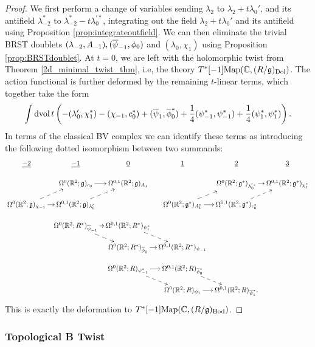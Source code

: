 \documentclass[10pt, oneside]{article}
\begin{document}
\begin{proof}
We first perform a change of variables sending $\lambda_2$ to $\lambda_2 + t\lambda_0'$, and its antifield $\lambda_{-2}^*$ to $\lambda_{-2}^* - t\lambda_0^{'*}$, integrating out the field $\lambda_2 + t\lambda_0'$ and its antifield using Proposition \ref{prop:integrateoutfield}.  We can then eliminate the trivial BRST doublets $(\lambda_{-2}, A_{-1}), (\overline{\psi}_{-1}, \phi_0)$ and $(\lambda_0, \chi_1)$ using Proposition \ref{prop:BRSTdoublet}.  At $t=0$, we are left with the holomorphic twist from Theorem \ref{2d_minimal_twist_thm}, i.e, the theory $T^*[-1]\mathrm{Map}(\mathbb C, (R/\mathfrak{g})_{\mathrm{Dol}})$.  The action functional is further deformed by the remaining $t$-linear terms, which together take the form
\[\int \operatorname{dvol} t\left( -(\lambda'_0, \chi_{1}^*) - (\chi_{-1}, c_0^*) + (\overline{\psi}_1, \overline{\phi}_0^*) + \frac 14 (\psi^*_{-1} ,\psi^*_{-1}) + \frac 14  (\psi^*_{1}, \psi^*_{1})\right).\]
In terms of the classical BV complex we can identify these terms as introducing the following dotted isomorphism between two summands:
\[\xymatrix@R=0.4cm@C=0.2cm{
\ul{-2} & \ul{-1} & \ul{0} & \ul{1} & \ul{2} & \ul{3} \\
&\Omega^0(\RR^2; \gg)_{c_0} \ar[r] &\Omega^{0,1}(\RR^2; \gg)_{A_1} & & \Omega^0(\RR^2; \gg^*)_{\lambda^{'*}_0} \ar[r] &\Omega^{0,1}(\RR^2; \gg^*)_{\chi_1^*} \\
\Omega^0(\RR^2; \gg)_{\chi_{-1}} \ar[r] \ar@{-->}[ur] &\Omega^{0,1}(\RR^2; \gg)_{\lambda'_0} \ar@{-->}[ur] && \Omega^0(\RR^2; \gg^*)_{A^*_1} \ar[r] \ar@{-->}[ur] &\Omega^{0,1}(\RR^2; \gg^*)_{c_0^*} \ar@{-->}[ur]\\
&\Omega^0(\RR^2; R^*)_{\ol \psi_{-1}} \ar[r] \ar@{-->}[dr] &\Omega^{0,1}(\RR^2; R^*)_{\psi^*_1} \ar@{-->}[dr] &&&\\
&& \Omega^0(\RR^2; R^*)_{\ol \phi_0} \ar[r]  &\Omega^{0,1}(\RR^2; R^*)_{\psi_{-1}} &&\\
&&\Omega^0(\RR^2; R)_{\psi_{-1}^*} \ar[r] \ar@{-->}[dr] &\Omega^{0,1}(\RR^2;  R)_{\ol \phi^*_0} \ar@{-->}[dr] &&\\
&&& \Omega^0(\RR^2; R)_{\psi_1} \ar[r]  &\Omega^{0,1}(\RR^2; R)_{\ol \psi^*_{1}}. &\\
}\]
This is exactly the deformation to $T^*[-1]\mathrm{Map}(\mathbb C, (R/\mathfrak{g})_{\mathrm{Hod}})$.
\end{proof}

\subsubsection{Topological B Twist} \label{sect:2d22Btwist}
\end{document}
